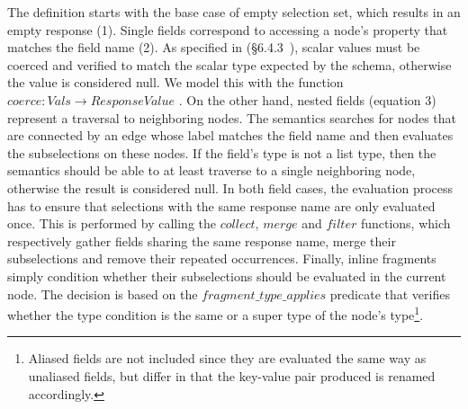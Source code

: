 The definition starts with the base case of empty selection set, which results in an empty response (1). 
Single fields correspond to accessing a node's property that matches the field name (2). 
As specified in \spec (\cf\S6.4.3~\cite{gqlspec}), scalar values must be coerced and verified to match the scalar type expected by the schema, otherwise the value is considered null.
We model this with the function  $\mathit{coerce} : \mathit{Vals} \to \mathit{ResponseValue}$
%
%
.
On the other hand, nested fields (equation 3) represent a traversal to neighboring nodes. The semantics searches for nodes that are connected by an edge whose label matches the field name
and then evaluates the subselections on these nodes. If the field's type is not a list type, then the semantics should be able to at least traverse to a single neighboring node, otherwise the result is considered null. 
In both field cases, the evaluation process has to ensure that selections with the same response name are only evaluated once. 
This is performed by calling the $\mathit{collect}$, $\mathit{merge}$ and $\mathit{filter}$ functions, which respectively gather fields sharing the same response name, merge their subselections 
and remove their repeated occurrences. 
Finally, inline fragments simply condition whether their subselections should be evaluated in the current node. 
The decision is based on the $\mathit{fragment\_type\_applies}$ predicate that verifies whether the type condition is the same or a super type of the node's type\footnote{Aliased fields are not included since they are evaluated the same way as unaliased fields, but differ in that the key-value pair produced is renamed accordingly.}.


